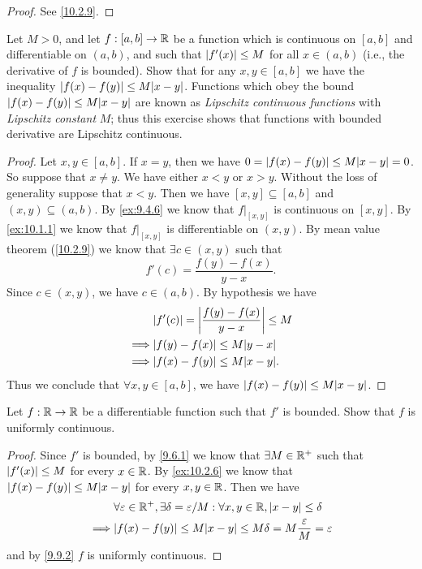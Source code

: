 \begin{proof}
  See \cref{10.2.9}.
\end{proof}

\begin{ex}\label{ex:10.2.6}
  Let \(M > 0\), and let \(f : [a, b] \to \mathbb{R}\) be a function which is continuous on \([a, b]\) and differentiable on \((a, b)\), and such that \(\left\lvert f'(x)\right\rvert \leq M\) for all \(x \in (a, b)\) (i.e., the derivative of \(f\) is bounded).
  Show that for any \(x, y \in [a, b]\) we have the inequality \(\abs{f(x) - f(y)} \leq M \abs{x - y}\).
  Functions which obey the bound \(\abs{f(x) - f(y)} \leq M \abs{x - y}\) are known as \emph{Lipschitz continuous functions} with \emph{Lipschitz constant} \(M\);
  thus this exercise shows that functions with bounded derivative are Lipschitz continuous.
\end{ex}

\begin{proof}
  Let \(x, y \in [a, b]\).
  If \(x = y\), then we have \(0 = \abs{f(x) - f(y)} \leq M \abs{x - y} = 0\).
  So suppose that \(x \neq y\).
  We have either \(x < y\) or \(x > y\).
  Without the loss of generality suppose that \(x < y\).
  Then we have \([x, y] \subseteq [a, b]\) and \((x, y) \subseteq (a, b)\).
  By \cref{ex:9.4.6} we know that \(f|_{[x, y]}\) is continuous on \([x, y]\).
  By \cref{ex:10.1.1} we know that \(f|_{[x, y]}\) is differentiable on \((x, y)\).
  By mean value theorem (\cref{10.2.9}) we know that \(\exists c \in (x, y)\) such that
  \[
    f'(c) = \dfrac{f(y) - f(x)}{y - x}.
  \]
  Since \(c \in (x, y)\), we have \(c \in (a, b)\).
  By hypothesis we have
  \begin{align*}
             & \abs{f'(c)} = \abs{\dfrac{f(y) - f(x)}{y - x}} \leq M \\
    \implies & \abs{f(y) - f(x)} \leq M \abs{y - x}                  \\
    \implies & \abs{f(x) - f(y)} \leq M \abs{x - y}.
  \end{align*}
  Thus we conclude that \(\forall x, y \in [a, b]\), we have \(\abs{f(x) - f(y)} \leq M \abs{x - y}\).
\end{proof}

\begin{ex}\label{ex:10.2.7}
  Let \(f : \mathbb{R} \to \mathbb{R}\) be a differentiable function such that \(f'\) is bounded.
  Show that \(f\) is uniformly continuous.
\end{ex}

\begin{proof}
  Since \(f'\) is bounded, by \cref{9.6.1} we know that \(\exists M \in \mathbb{R}^+\) such that \(\left\lvert f'(x)\right\rvert \leq M\) for every \(x \in \mathbb{R}\).
  By \cref{ex:10.2.6} we know that \(\abs{f(x) - f(y)} \leq M \abs{x - y}\) for every \(x, y \in \mathbb{R}\).
  Then we have
  \begin{align*}
             & \forall \varepsilon \in \R^+, \exists \delta = \varepsilon / M : \forall x, y \in \R, \abs{x - y} \leq \delta \\
    \implies & \abs{f(x) - f(y)} \leq M \abs{x - y} \leq M \delta = M \dfrac{\varepsilon}{M} = \varepsilon
  \end{align*}
  and by \cref{9.9.2} \(f\) is uniformly continuous.
\end{proof}